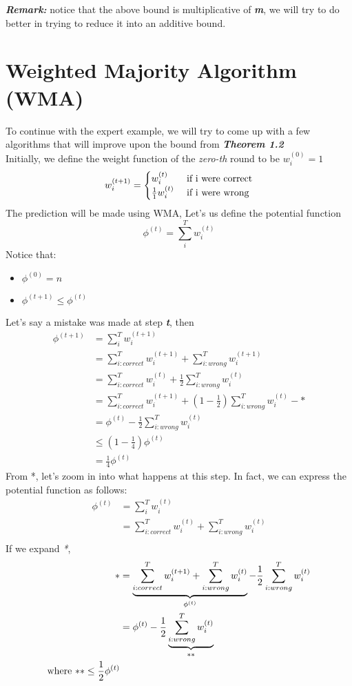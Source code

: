 \documentclass[12pt]{article}
\begin{document}
\textbf{\textit{Remark: }} notice that the above bound is multiplicative of  \textbf{\textit{m}}, we will try to do better in trying to reduce it into an additive bound.
\section{Weighted Majority Algorithm (WMA)}
To continue with the expert example, we will try to  come up with a few algorithms that will improve upon the bound from \textbf{\textit{Theorem 1.2}}\\

Initially, we define the weight function of the \textit{zero-th} round to be $w_i^{(0)} =1$
$$
w_i^{(t+1)} = \begin{cases}
w_i^{(t)} &\textmd{ if i were correct} \\
\frac{1}{1}w_i^{(t)} & \text{ if i were wrong}
\end{cases}
$$
The prediction will be made using WMA,
Let's us define the potential function 
$$\phi^{(t)} = \sum_{i}^{T}w_i^{(t)} $$
Notice that:
\begin{itemize}
\item $\phi^{(0)}=n$
\item $\phi^{(t+1)} \leq \phi^{(t)}$
\end{itemize}
Let's say a mistake was made at step \textbf{\textit{t}}, then
\begin{align*}
\phi^{(t+1)} & = \sum_{i}^{T}w_i^{(t+1)} \\
&= \sum_{i: correct}^{T}w_i^{(t+1)} +\sum_{i:wrong}^{T}w_i^{(t+1)}\\
&= \sum_{i: correct}^{T}w_i^{(t)} + \frac{1}{2}\sum_{i: wrong}^{T}w_i^{(t)} \\
&= \sum_{i: correct}^{T}w_i^{(t+1)}  +(1- \frac{1}{2})\sum_{i: wrong}^{T}w_i^{(t)} -{*}\\
&= \phi^{(t)}  -  \frac{1}{2}\sum_{i: wrong}^{T}w_i^{(t)} \\
&\leq(1-\frac{1}{4}) \phi^{(t)} \\
&= \frac{1}{4} \phi^{(t)}
\end{align*}
From \textsc{*}, let's zoom in into what happens at this step. In fact, we can express the potential function as follows:
\begin{align*}
\phi^{(t)} &= \sum_{i}^{T}w_i^{(t)} \\
&=\sum_{i: correct}^{T}w_i^{(t)} +\sum_{i:wrong}^{T}w_i^{(t)}\\
\end{align*}
If we expand \textit{*},
\begin{align*}
* & = \underbrace{ \sum_{i: correct}^{T}w_i^{(t+1)}  + \sum_{i: wrong}^{T}w_i^{(t)} }_{\phi^{(t)}}  - \frac{1}{2} \sum_{i: wrong}^{T}w_i^{(t)}\\
&= \phi^{(t)} - \frac{1}{2} \underbrace{\sum_{i: wrong}^{T}w_i^{(t)}}_{**}\\
\textmd{where } {**} \leq \frac{1}{2}\phi^{(t)}
\end{align*}
\end{document}
